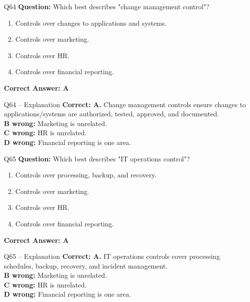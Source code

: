 \documentclass[aspectratio=169,10pt]{beamer}
\begin{document}
	\begin{frame}[t]{Q64}
		\small
		\textbf{Question:} Which best describes "change management control"?
		\begin{enumerate}[label=\Alph*.,itemsep=1pt,topsep=2pt]
			\item Controls over changes to applications and systems.
			\item Controls over marketing.
			\item Controls over HR.
			\item Controls over financial reporting.
		\end{enumerate}
		\vspace{4pt}
		\textbf{Correct Answer: A}
	\end{frame}
	
	\begin{frame}[t]{Q64 -- Explanation}
		\small
		\textbf{Correct: A.} Change management controls ensure changes to applications/systems are authorized, tested, approved, and documented. \\[4pt]
		\textbf{B wrong:} Marketing is unrelated. \\[2pt]
		\textbf{C wrong:} HR is unrelated. \\[2pt]
		\textbf{D wrong:} Financial reporting is one area.
	\end{frame}
	
	\begin{frame}[t]{Q65}
		\small
		\textbf{Question:} Which best describes "IT operations control"?
		\begin{enumerate}[label=\Alph*.,itemsep=1pt,topsep=2pt]
			\item Controls over processing, backup, and recovery.
			\item Controls over marketing.
			\item Controls over HR.
			\item Controls over financial reporting.
		\end{enumerate}
		\vspace{4pt}
		\textbf{Correct Answer: A}
	\end{frame}
	
	\begin{frame}[t]{Q65 -- Explanation}
		\small
		\textbf{Correct: A.} IT operations controls cover processing schedules, backup, recovery, and incident management. \\[4pt]
		\textbf{B wrong:} Marketing is unrelated. \\[2pt]
		\textbf{C wrong:} HR is unrelated. \\[2pt]
		\textbf{D wrong:} Financial reporting is one area.
	\end{frame}
	
\end{document}
